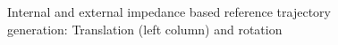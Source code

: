 \documentclass[a4paper,twoside, openright,12pt]{report}
\begin{document}
%


%


\begin{figure}[h]

\label{FIG:CaViSim}
\caption[Simulation results: Internal and external impedance based reference trajectory generation]{Internal and external impedance based reference trajectory generation: Translation (left column) and rotation}
\end{figure}
\end{document}
